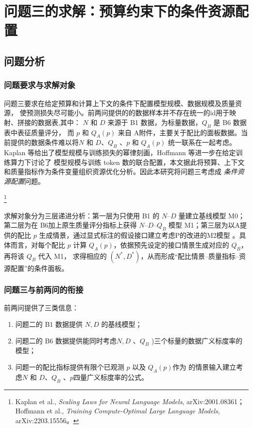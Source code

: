 
\section{问题三的求解：预算约束下的条件资源配置}
\label{sec:q3}

\subsection{问题分析}
\label{sec:q3-analysis}

\subsubsection{问题要求与求解对象}

问题三要求在给定预算和计算上下文的条件下配置模型规模、数据规模及质量资源，
使预测损失尽可能小。前两问提供的的数据样本并不存在统一的id用于映射、拼接的数据表,其中：
$N$ 和 $D$ 来源于 B1 数据，为标量数据，$Q_B$ 是 B6 数据表中表征质量评分，
而 $p$ 和 $Q_A(p)$ 来自 A附件，主要关于配比的面板数据。当前提供的数据条件难以将$N$ 和 $D$、$Q_B$ 、$p$ 和 $Q_A(p)$ 统一联系在一起考虑。Kaplan 等给出了模型规模与训练损失的幂律刻画，Hoffmann 等进一步在给定训练算力下讨论了
模型规模与训练 token 数的联合配置，本文据此将预算、上下文和质量指标作为条件变量组织资源优化分析。因此本研究将问题三考虑成
\emph{条件资源配置}问题。

\footnote{Kaplan et al., \emph{Scaling Laws for Neural Language Models}, arXiv:2001.08361；
Hoffmann et al., \emph{Training Compute-Optimal Large Language Models}, arXiv:2203.15556。}

求解对象分为三层递进分析：第一层为只使用 B1 的 $N$--$D$ 量建立基线模型 M0；第二层为在
B6加上原生质量评分指标上获得 $N$--$D$--$Q_B$ 模型 M1；第三层为以A提供的配比
$p$ 生成情景，通过显式标注的假设接口建立考虑P的改进的M2模型 。具体而言，对每个配比
$p$ 计算 $Q_A(p)$，依据预先设定的接口情景生成对应的 $Q_B$，再将该 $Q_B$ 代入 M1，
求得相应的 $(N^*,D^*)$，从而形成“配比情景--质量指标--资源配置”的条件面板。


\subsubsection{问题三与前两问的衔接}

前两问提供了三类信息：
\begin{enumerate}
  \item 问题二的 B1 数据提供 $N,D$ 的基线模型；
  \item 问题二的 B6 数据提供能同时考虑$N,D$ 、$Q_B$ )三个标量的数据广义标度率的模型；
  \item 问题一的配比指标提供有限个已观测 $p$ 以及 $Q_A(p)$作为 的情景输入建立考虑$N$ 和 $D$、$Q_B$ 、$p$四量广义标度率的公式。
\end{enumerate}


